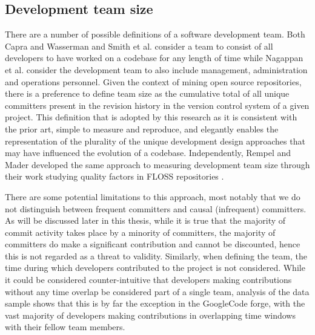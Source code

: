 \subsection{Development team size}
There are a number of possible definitions of a software development team. Both Capra and Wasserman and Smith et al. consider a team to consist of all developers to have worked on a codebase for any length of time \citep{smith2001empirical, capra2008framework} while Nagappan et al. \citep{nagappan2008influence} consider the development team to also include management, administration and operations personnel. Given the context of mining open source repositories, there is a preference to define team size as the cumulative total of all unique committers present in the revision history in the version control system of a given project. This definition that is adopted by this research as it is consistent with the prior art, simple to measure and reproduce, and elegantly enables the representation of the plurality of the unique development design approaches that may have influenced the evolution of a codebase. Independently, Rempel and Mader developed the same approach to measuring development team size through their work studying quality factors in FLOSS repositories \citep{rempel2017preventing}.

There are some potential limitations to this approach, most notably that we do not distinguish between frequent committers and causal (infrequent) committers. As will be discussed later in this thesis, while it is true that the majority of commit activity takes place by a minority of committers, the majority of committers do make a significant contribution and cannot be discounted, hence this is not regarded as a threat to validity. Similarly, when defining the team, the time during which developers contributed to the project is not considered. While it could be considered counter-intuitive that developers making contributions without any time overlap be considered part of a single team, analysis of the data sample shows that this is by far the exception in the GoogleCode forge, with the vast majority of developers making contributions in overlapping time windows with their fellow team members.

